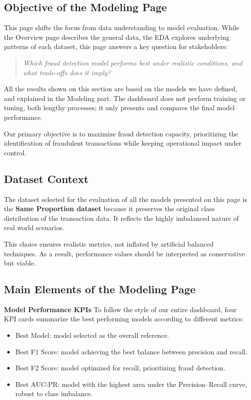 \documentclass[12pt,a4paper]{report}
\begin{document}
\subsection{Objective of the Modeling Page}

This page shifts the focus from data understanding to model evaluation. While the Overview page describes the general data, the EDA explores underlying patterns of each dataset, this page answers a key question for stakeholders: 

\begin{quote}
\emph{Which fraud detection model performs best under realistic conditions, and what trade-offs does it imply?}
\end{quote}
All the results shown on this section are based on the models we have defined, and explained in the Modeling part. The dashboard does not perform training or tuning, both lengthy processes; it only presents and compares the final model performance.

Our primary objective is to maximize fraud detection capacity, prioritizing the identification of fraudulent transactions while keeping operational impact under control.

\subsection{Dataset Context}
The dataset selected for the evaluation of all the models presented on this page is the \textbf{Same Proportion dataset} because it preserves the original class distribution of the transaction data. It reflects the highly imbalanced nature of real world scenarios.

This choice ensures realistic metrics, not inflated by artificial balanced techniques. As a result, performance values should be interpreted as conservative but viable. 

\subsection{Main Elements of the Modeling Page}

\textbf{Model Performance KPIs}
To follow the style of our entire dashboard, four KPI cards summarize the best performing models according to different metrics:

\begin{itemize}
    \item Best Model: model selected as the overall reference.
    \item Best F1 Score: model achieving the best balance between precision and recall.
    \item Best F2 Score: model optimized for recall, prioritizing fraud detection.
    \item Best AUC-PR: model with the highest area under the Precision--Recall curve, robust to class imbalance.
\end{itemize}
\end{document}
